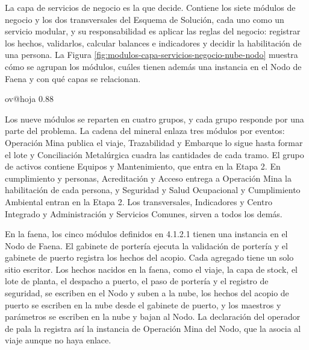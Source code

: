 \documentclass[subdoc]{../../comun/overfore}
\begin{document}
\enlargethispage{2\baselineskip}La capa de servicios de negocio es la que decide. Contiene los siete módulos de negocio y los dos transversales del Esquema de Solución, cada uno como un servicio modular, y su responsabilidad es aplicar las reglas del negocio: registrar los hechos, validarlos, calcular balances e indicadores y decidir la habilitación de una persona. La Figura \ref{fig:modulos-capa-servicios-negocio-nube-nodo} muestra cómo se agrupan los módulos, cuáles tienen además una instancia en el Nodo de Faena y con qué capas se relacionan.

\begin{horizontal}
\csname ov@hoja\endcsname{330.2mm}{215.9mm}
\expandafter\def\csname ov@altofig\endcsname{0.88}
\end{horizontal}
Los nueve módulos se reparten en cuatro grupos, y cada grupo responde por una parte del problema. La cadena del mineral enlaza tres módulos por eventos: Operación Mina publica el viaje, Trazabilidad y Embarque lo sigue hasta formar el lote y Conciliación Metalúrgica cuadra las cantidades de cada tramo. El grupo de activos contiene Equipos y Mantenimiento, que entra en la Etapa 2. En cumplimiento y personas, Acreditación y Acceso entrega a Operación Mina la habilitación de cada persona, y Seguridad y Salud Ocupacional y Cumplimiento Ambiental entran en la Etapa 2. Los transversales, Indicadores y Centro Integrado y Administración y Servicios Comunes, sirven a todos los demás.

En la faena, los cinco módulos definidos en 4.1.2.1 tienen una instancia en el Nodo de Faena. El gabinete de portería ejecuta la validación de portería y el gabinete de puerto registra los hechos del acopio. Cada agregado tiene un solo sitio escritor. Los hechos nacidos en la faena, como el viaje, la capa de stock, el lote de planta, el despacho a puerto, el paso de portería y el registro de seguridad, se escriben en el Nodo y suben a la nube, los hechos del acopio de puerto se escriben en la nube desde el gabinete de puerto, y los maestros y parámetros se escriben en la nube y bajan al Nodo. La declaración del operador de pala la registra así la instancia de Operación Mina del Nodo, que la asocia al viaje aunque no haya enlace.
\end{document}
